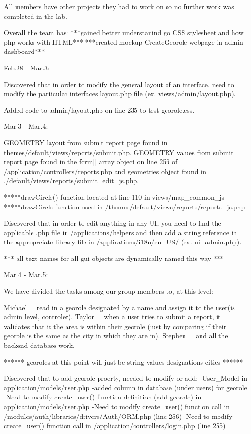 \documentclass{article}
\begin{document}
    All members have other projects they had to work on so no further work was completed in the lab.

    Overall the team has: 
	***gained better understanind go CSS stylesheet and how php works with HTML***
	***created mockup CreateGeorole webpage in admin dashboard***
	
Feb.28 - Mar.3:

    Discovered that in order to modify the general layout of an interface, need to modify the particular interfaces layout.php file (ex. views/admin/layout.php).
	
    Added code to admin/layout.php on line 235 to test georole.css.
	
Mar.3 - Mar.4:

    GEOMETRY layout from submit report page found in themes/default/views/reports/submit.php, GEOMETRY values from submit report page found in the form[] array object on line 256 of /application/controllers/reports.php and geometries object found in ./default/views/reports/submit_edit_js.php.

    *****drawCircle() function located at line 110 in views/map_common_js	
    *****drawCircle function used in /themes/default/views/reports/reports_js.php

    Discovered that in order to edit anything in any UI, you need to find the applicable .php file in /applications/helpers and then add a string reference in the appropreiate library file in /applications/i18n/en_US/ (ex. ui_admin.php).
	
    *** all text names for all gui objects are dynamically named this way ***

Mar.4 - Mar.5:

    We have divided the tasks among our group members to, at this level:
	
    Michael = read in a georole designated by a name and assign it to the user(is admin level, controler).
    Taylor = when a user tries to submit a report, it validates that it the area is within their georole (just by comparing if their georole is the same as the city in which they are in).
    Stephen = and all the backend database work.

    ****** georoles at this point will just be string values designations cities ******

    Discovered that to add georole proerty, needed to modify or add: 
	 -User_Model in application/models/user.php
	 -added column in database (under users) for georole
         -Need to modify create_user() function definition (add georole) in application/models/user.php
	 -Need to modify create_user() function call in /modules/auth/libraries/drivers/Auth/ORM.php (line 256)
	 -Need to modify create_user() function call in /application/controllers/login.php (line 255)
    
\end{document}
